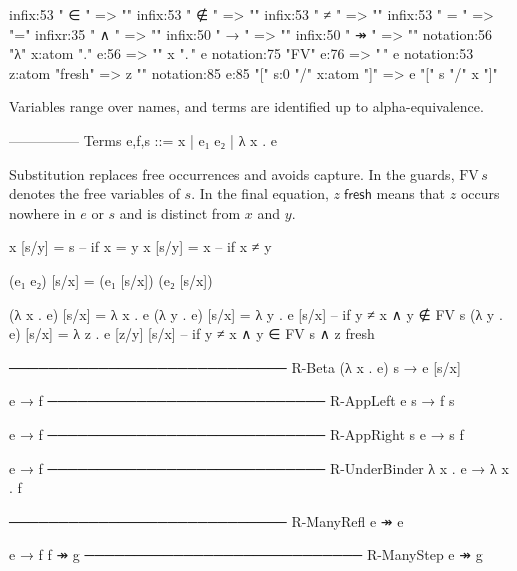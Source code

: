 \documentclass{article}
\begin{document}
\begin{inference-notation}
infix:53 " ∈ " => "\in"
infix:53 " ∉ " => "\notin"
infix:53 " ≠ " => "\ne"
infix:53 " = " => "="
infixr:35 " ∧ " => "\land"
infix:50 " → " => "\mathrel{\to_{\beta}}"
infix:50 " ↠ " => "\mathrel{\to_{\beta}^{*}}"
notation:56 "λ" x:atom "." e:56 => "\lambda " x ".\," e
notation:75 "FV" e:76 => "\," e
notation:53 z:atom "fresh" => z "\;"
notation:85 e:85 "[" s:0 "/" x:atom "]" => e "[" s "/" x "]"
\end{inference-notation}

Variables range over names, and terms are identified up to alpha-equivalence.

\begin{inference}[kind=bnf,rule_set=Untyped lambda syntax]
--------------- Terms
e,f,s ::= x | e₁ e₂
        | λ x . e
\end{inference}

Substitution replaces free occurrences and avoids capture. In the guards,
\(\mathrm{FV}\,s\) denotes the free variables of \(s\). In the final equation,
\(z\;\mathsf{fresh}\) means that \(z\) occurs nowhere in \(e\) or \(s\) and
is distinct from \(x\) and \(y\).

\begin{inference}[kind=equation,rule_set=Capture-avoiding substitution]
x [s/y] = s -- if x = y
x [s/y] = x -- if x ≠ y

(e₁ e₂) [s/x] = (e₁ [s/x]) (e₂ [s/x])

(λ x . e) [s/x] = λ x . e
(λ y . e) [s/x] = λ y . e [s/x] -- if y ≠ x ∧ y ∉ FV s
(λ y . e) [s/x] = λ z . e [z/y] [s/x] -- if y ≠ x ∧ y ∈ FV s ∧ z fresh
\end{inference}

\begin{inference}[rule_set=Beta reduction]
──────────────────────────── R-Beta
(λ x . e) s → e [s/x]

e → f
──────────────────────────── R-AppLeft
e s → f s

e → f
──────────────────────────── R-AppRight
s e → s f

e → f
──────────────────────────── R-UnderBinder
λ x . e → λ x . f
\end{inference}

\begin{inference}[rule_set=Multi-step reduction]
──────────────────────────── R-ManyRefl
e ↠ e

e → f
f ↠ g
──────────────────────────── R-ManyStep
e ↠ g
\end{inference}
\end{document}
